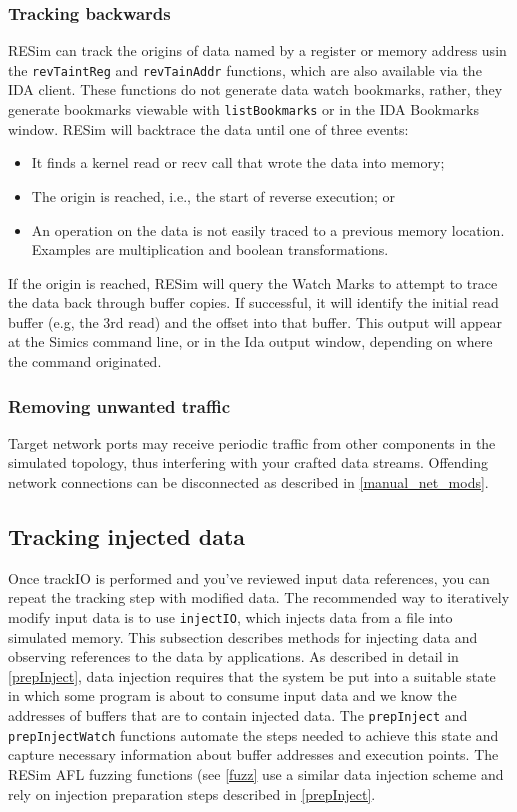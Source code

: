 \documentclass[titlepage]{article}
\begin{document}
\subsubsection{Tracking backwards}
RESim can track the origins of data named by a register or memory address usin the {\tt revTaintReg} and {\tt revTainAddr} functions, which are also
available via the IDA client.  These functions do not generate data watch bookmarks, rather, they generate bookmarks viewable with {\tt listBookmarks} or
in the IDA Bookmarks window.  RESim will backtrace the data until one of three events:
\begin{itemize}
\item It finds a kernel read or recv call that wrote the data into memory;
\item The origin is reached, i.e., the start of reverse execution; or
\item An operation on the data is not easily traced to a previous memory location.  Examples are multiplication and boolean transformations.
\end{itemize}
If the origin is reached, RESim will query the Watch Marks to attempt to trace the data back through buffer copies.  If successful, it will identify
the initial read buffer (e.g, the 3rd read) and the offset into that buffer.  This output will appear at the Simics command line, or in the Ida output
window, depending on where the command originated.

\subsubsection{Removing unwanted traffic}
Target network ports may receive periodic traffic from other components in the simulated topology, thus interfering with your crafted data streams.
Offending network connections can be disconnected as described in \ref{manual_net_mods}.

\subsection{Tracking injected data}
\label{tracking-injected-data}
Once trackIO is performed and you've reviewed input data references, you can repeat the tracking step with modified data.
The recommended way to iteratively modify input data is to use  {\tt injectIO}, which injects data from a file into simulated memory.
This subsection describes methods for injecting data and observing references to the data by applications.
As described in detail in \ref{prepInject}, data injection requires that the system be put into a suitable
state in which some program is about to consume input data and we know the addresses of buffers that are to contain injected data.
The {\tt prepInject} and {\tt prepInjectWatch} functions automate the steps needed to achieve this state and capture necessary information 
about buffer addresses and execution points.    
The RESim AFL fuzzing functions (see \ref{fuzz} use a similar data injection scheme and rely on injection preparation steps described in \ref{prepInject}.
\end{document}
